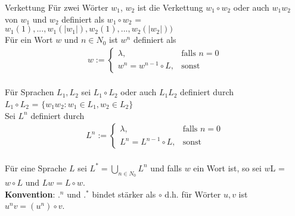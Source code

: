 \begin{defn}{Verkettung} 
    Für zwei Wörter $w_1$, $w_2$ ist die Verkettung $w_1 \circ w_2$ oder 
    auch $w_1$$w_2$ von $w_1$ und $w_2$ definiert als $w_1 \circ w_2$ = $w_1(1),...,w_1(\vert w_1 \vert),w_2(1),...,w_2(\vert w_2 \vert))$ \\

    Für ein Wort $w$ und $n \in N_0$ ist $w^n$ definiert als \\
        \begin{align*}    
            w := 
            \begin{cases} 
                \lambda, & \text{falls } n = 0 \\ 
                w^n = w^{n-1} \circ L, &\text{sonst} 
            \end{cases}
        \end{align*} \\

    Für Sprachen $L_1, L_2$ sei $L_1 \circ L_2$ oder auch $L_1L_2$ definiert durch  \\
    $L_1 \circ L_2$ = $\{w_1w_2: w_1 \in L_1, w_2 \in L_2\}$ \\

    Sei $L^n$ definiert durch \\
        \begin{align*}  
            L^n :=
            \begin{cases} 
                \lambda, & \text{falls } n = 0 \\ 
                L^n = L^{n-1} \circ L, &\text{sonst} 
            \end{cases}
        \end{align*}\\

    Für eine Sprache $L$ sei $L^*= \bigcup\limits_{n \in N_0} L^n$ und falls $w$ ein Wort ist, so sei $w$L = $w \circ L$ und $Lw = L \circ w$. \\
        
    \textbf{Konvention}: $.^n$ und $.^*$ bindet stärker als $\circ$ d.h. für Wörter $u,v$ ist $u^nv = (u^n)\circ v$.
\end{defn}